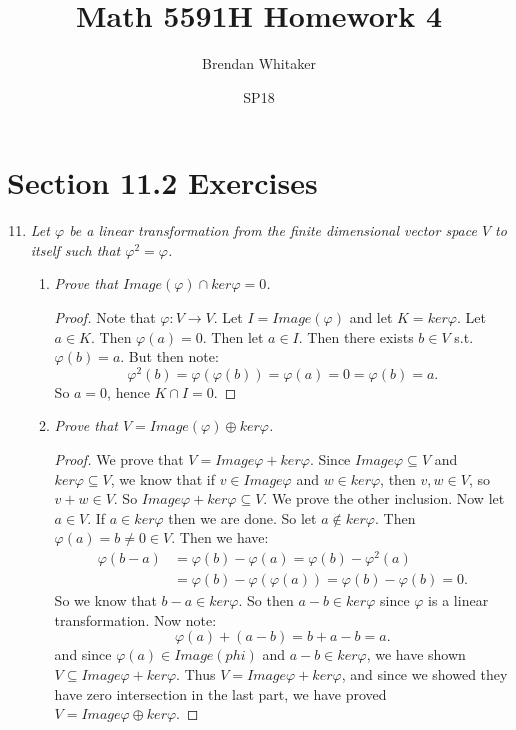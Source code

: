 \documentclass[10pt,oneside,reqno]{amsart}
\theoremstyle{plain}
\theoremstyle{definition}
\theoremstyle{remark}
\newcommand{\sub}{\subseteq}
\newcommand{\bee}{\begin{equation}\begin{aligned}}
\newcommand{\eee}{\end{aligned}\end{equation}}
\renewcommand{\phi}{\varphi}
\begin{document}
\title{Math 5591H Homework 4}

\date{SP18}

\author[Brendan Whitaker]{Brendan Whitaker}

\maketitle



\section*{Section 11.2 Exercises}



\begin{enumerate}[label=\arabic*.]

\setcounter{enumi}{10}

\item \textit{Let $\phi$ be a linear transformation from the finite dimensional vector space $V$ to itself such that $\phi^2 = \phi$. }

\begin{enumerate}
\item \textit{Prove that $Image(\phi) \cap ker\phi = 0$. }

\begin{proof}
Note that $\phi:V \to V$. Let $I = Image(\phi)$ and let $K = ker\phi$. Let $a \in K$. Then $\phi(a) = 0$. Then let $a \in I$. Then there exists $b \in V$ s.t. $\phi(b) = a$. But then note:
$$
\phi^2(b) = \phi(\phi(b)) = \phi(a) = 0 = \phi(b) = a.
$$
So $a = 0$, hence $K \cap I = 0$. 
\end{proof}

\item \textit{Prove that $V = Image(\phi)\oplus ker\phi$. }

\begin{proof}
We prove that $V = Image\phi + ker\phi$. Since $Image\phi \sub V$ and $ker\phi \sub V$, we know that if $v \in Image\phi$ and $w \in ker\phi$, then $v,w \in V$, so $v + w \in V$. So $Image\phi + ker\phi \sub V$. We prove the other inclusion. Now let $a \in V$. If $a \in ker\phi$ then we are done. So let $a \notin ker\phi$. Then $\phi(a) = b \neq 0 \in V$. Then we have: 
\bee
\phi(b - a) &= \phi(b) - \phi(a) = \phi(b) - \phi^2(a)\\
 &= \phi(b) - \phi(\phi(a)) = \phi(b) - \phi(b) = 0.
\eee
So we know that $b - a \in ker\phi$. So then $a - b \in ker\phi$ since $\phi$ is a linear transformation. Now note: 
$$
\phi(a) + (a - b) = b + a - b = a.
$$
and since $\phi(a) \in Image(phi)$ and $a - b \in ker\phi$, we have shown $V \sub Image\phi + ker\phi$. Thus $V = Image\phi + ker\phi$, and since we showed they have zero intersection in the last part, we have proved $V = Image\phi \oplus ker\phi$. 
\end{proof}


\end{enumerate}
\end{enumerate}
\end{document}

